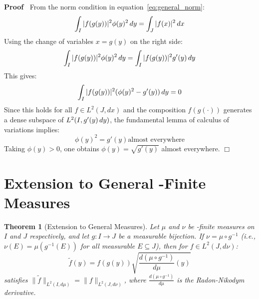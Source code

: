 \documentclass{article}
\newenvironment{proof}{\noindent\textbf{Proof\ }}{\hspace*{\fill}$\Box$\medskip}
\newtheorem{theorem}{Theorem}
\begin{document}
\begin{proof}
  From the norm condition in equation~\eqref{eq:general_norm}:
  \begin{equation}
    \label{eq:phi_condition} \int_I |f (g (y)) |^2 \phi (y)^2  \hspace{0.17em}
    dy = \int_J |f (x) |^2  \hspace{0.17em} dx
  \end{equation}
  Using the change of variables $x = g (y)$ on the right side:
  \begin{equation}
    \label{eq:phi_comparison} \int_I |f (g (y)) |^2 \phi (y)^2 
    \hspace{0.17em} dy = \int_I |f (g (y)) |^2 g' (y)  \hspace{0.17em} dy
  \end{equation}
  This gives:
  \begin{equation}
    \label{eq:phi_difference} \int_I |f (g (y)) |^2  (\phi (y)^2 - g' (y)) 
    \hspace{0.17em} dy = 0
  \end{equation}
  Since this holds for all $f \in L^2 (J, dx)$ and the composition $f (g
  (\cdot))$ generates a dense subspace of $L^2 (I, g' (y) \hspace{0.17em}
  dy)$, the fundamental lemma of calculus of variations implies:
  \begin{equation}
    \label{eq:phi_ae_equal} \phi (y)^2 = g' (y) \text{almost everywhere}
  \end{equation}
  Taking $\phi (y) > 0$, one obtains $\phi (y) = \sqrt{g' (y)}$ almost
  everywhere.
\end{proof}

\section{Extension to General {\sigma}-Finite Measures}

\begin{theorem}[Extension to General Measures]
  \label{thm:general_measures}Let $\mu$ and $\nu$ be {\sigma}-finite measures
  on $I$ and $J$ respectively, and let $g : I \to J$ be a measurable
  bijection. If $\nu = \mu \circ g^{- 1}$ (i.e., $\nu (E) = \mu (g^{- 1} (E))$
  for all measurable $E \subseteq J$), then for $f \in L^2 (J, d \nu)$:
  \begin{equation}
    \label{eq:general_transform} \tilde{f} (y) = f (g (y)) \sqrt{\frac{d (\mu
    \circ g^{- 1})}{d \mu} (y)}
  \end{equation}
  satisfies $\| \tilde{f} \|_{L^2 (I, d \mu)} = \|f\|_{L^2 (J, d \nu)}$, where
  $\frac{d (\mu \circ g^{- 1})}{d \mu}$ is the Radon-Nikodym derivative.
\end{theorem}
\end{document}
